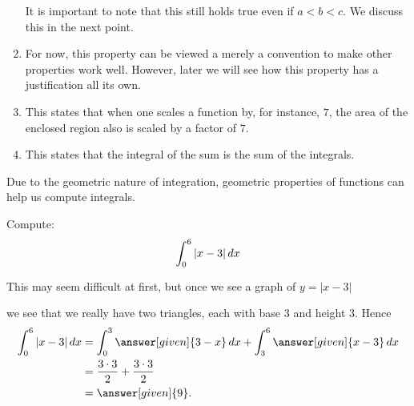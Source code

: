 \documentclass{ximera}
\begin{document}
\begin{theorem}
\begin{explanation}
\begin{enumerate}
\begin{image}
  \end{image}		
  It is important to note that this still holds true even if
  $a<b<c$. We discuss this in the next point.
  
\item For now, this property can be viewed a merely a convention to
  make other properties work well. However, later we will see how this
  property has a justification all its own.

\item This states that when one scales a function by, for instance, $7$,
  the area of the enclosed region also is scaled by a factor of
  $7$.
\item This states that the integral of the sum is the sum of the
  integrals.
\end{enumerate}
\end{explanation}
\end{theorem}

Due to the geometric nature of integration, geometric properties of
functions can help us compute integrals.

\begin{example}
  Compute:
  \[
  \int_0^6 |x-3| \,d x
  \]
  \begin{explanation}
    This may seem difficult at first, but once we see a graph of $y=|x-3|$
    \begin{image}
    \end{image}
    we see that we really have two triangles, each with base $3$ and height $3$.
    Hence
    \begin{align*}
    \int_0^6 |x-3| \d x &= \int_0^3 \answer[given]{3-x} \d x + \int_3^6 \answer[given]{x-3} \d x\\
    &= \frac{3\cdot 3}{2} + \frac{3\cdot 3}{2}\\
    &=\answer[given]{9}.
    \end{align*}
  \end{explanation}
\end{example}
\end{document}
